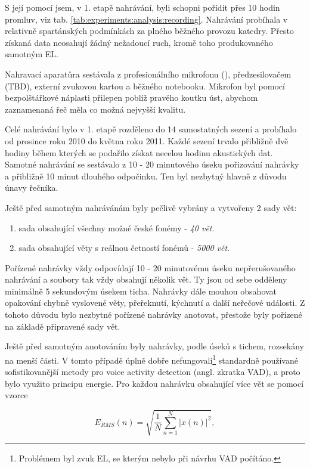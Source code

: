 S její pomocí jsem, v 1. etapě nahrávání, byli schopni pořídit přes 10 hodin promluv, viz tab. \ref{tab:experiments:analysis:recording}. Nahrávání probíhala v relativně spartánských podmínkách za plného běžného provozu katedry. Přesto získaná data neosahují žádný nežadoucí ruch, kromě toho produkovaného samotným EL.

Nahravací aparatůra sestávala z profesionálního mikrofonu (), předzesilovačem (TBD), externí zvukovou kartou a běžného notebooku. Mikrofon byl pomocí bezpolštářkové náplasti přilepen poblíž pravého koutku úst, abychom zaznamenaná řeč měla co možná nejvyšší kvalitu.

Celé nahrávání bylo v 1. etapě rozděleno do 14 samostatných sezení a probíhalo od prosince roku 2010 do května roku 2011. Každé sezení trvalo přibližně dvě hodiny během kterých se podařilo získat necelou hodinu akustických dat. Samotné nahrávání se sestávalo z 10 - 20 minutového úseku pořizování nahrávky a přibližně 10 minut dlouhého odpočinku. Ten byl nezbytný hlavně z důvodu únavy řečníka.

Ještě před samotným nahrávánám byly pečlivě vybrány a vytvořeny 2 sady vět:

\begin{enumerate}
  \item sada obsahující všechny možné české fonémy - \textit{40 vět}.
  \item sada obsahující věty s reálnou četností fonémů - \textit{5000 vět}.
\end{enumerate}

\noindent Pořízené nahrávky vždy odpovídají 10 - 20 minutovému úseku nepřerušovaného nahrávání a soubory tak vždy obsahují několik vět. Ty jsou od sebe odděleny minimálně 5 sekundovým úsekem ticha. Nahrávky dále mouhou obsahovat opakování chybně vyslovené věty, přeřeknutí, kýchnutí a další neřečové události. Z tohoto důvodu bylo nezbytné pořízené nahrávky anotovat, přestože byly pořízené na základě připravené sady vět.

Ještě před samotným anotováním byly nahrávky, podle úseků s tichem, rozsekány na menší části. V tomto případě úplně dobře nefungovali\footnote{Problémem byl zvuk EL, se kterým nebylo při návrhu VAD počítáno.} standardně používané sofistikovanější metody pro voice activity detection (angl. zkratka VAD), a proto bylo využito principu energie. Pro každou nahrávku obsahující více vět se pomocí vzorce

\begin{equation}
  \label{eq:experiments:analysis:energy}
  E_{RMS}(n) = \sqrt{\frac{1}{N} \sum_{n=1}^{N} \left| x(n) \right|^2},
\end{equation}

